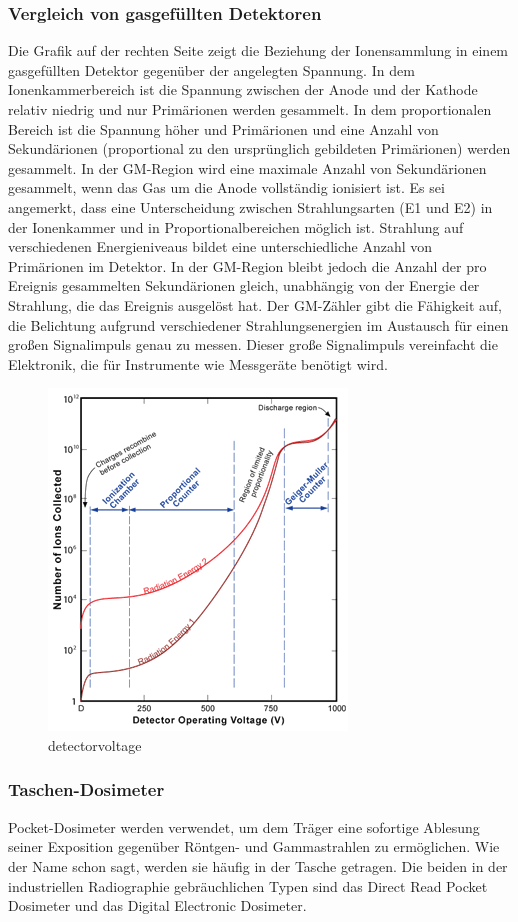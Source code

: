{\subsubsection{Vergleich von gasgefüllten Detektoren}
Die Grafik auf der rechten Seite zeigt die Beziehung der Ionensammlung in einem gasgefüllten Detektor gegenüber der angelegten Spannung. In dem Ionenkammerbereich ist die Spannung zwischen der Anode und der Kathode relativ niedrig und nur Primärionen werden gesammelt. In dem proportionalen Bereich ist die Spannung höher und Primärionen und eine Anzahl von Sekundärionen (proportional zu den ursprünglich gebildeten Primärionen) werden gesammelt. In der GM-Region wird eine maximale Anzahl von Sekundärionen gesammelt, wenn das Gas um die Anode vollständig ionisiert ist. Es sei angemerkt, dass eine Unterscheidung zwischen Strahlungsarten (E1 und E2) in der Ionenkammer und in Proportionalbereichen möglich ist. Strahlung auf verschiedenen Energieniveaus bildet eine unterschiedliche Anzahl von Primärionen im Detektor. In der GM-Region bleibt jedoch die Anzahl der pro Ereignis gesammelten Sekundärionen gleich, unabhängig von der Energie der Strahlung, die das Ereignis ausgelöst hat. Der GM-Zähler gibt die Fähigkeit auf, die Belichtung aufgrund verschiedener Strahlungsenergien im Austausch für einen großen Signalimpuls genau zu messen. Dieser große Signalimpuls vereinfacht die Elektronik, die für Instrumente wie Messgeräte benötigt wird.
\begin{figure}[htb]
\centering
  \includegraphics[scale=0.9]{img/detectorvoltage.png}
  \caption{detectorvoltage}
  \label{fig:detectorvoltage}
\end{figure}
\subsubsection{Taschen-Dosimeter}
Pocket-Dosimeter werden verwendet, um dem Träger eine sofortige Ablesung seiner Exposition gegenüber Röntgen- und Gammastrahlen zu ermöglichen. Wie der Name schon sagt, werden sie häufig in der Tasche getragen. Die beiden in der industriellen Radiographie gebräuchlichen Typen sind das Direct Read Pocket Dosimeter und das Digital Electronic Dosimeter.
}
